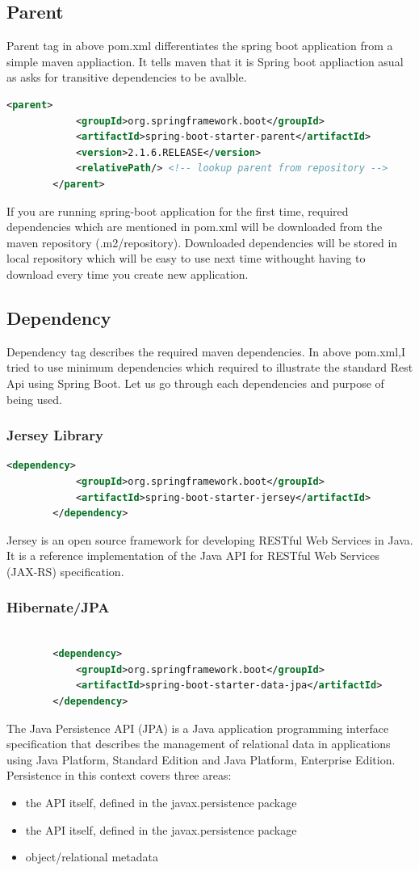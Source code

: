 \documentclass{report}
\begin{document}
	\subsection{Parent}
	Parent tag in above pom.xml differentiates the spring boot application from a simple maven appliaction. It tells maven that it is Spring boot appliaction asual as asks for transitive dependencies to be avalble.
		\begin{lstlisting}[language=xml]
		<parent>
			<groupId>org.springframework.boot</groupId>
			<artifactId>spring-boot-starter-parent</artifactId>
			<version>2.1.6.RELEASE</version>
			<relativePath/> <!-- lookup parent from repository -->
		</parent>
		\end{lstlisting}
	If you are running spring-boot application for the first time, required dependencies which are mentioned in pom.xml will be downloaded from the maven repository (.m2/repository). Downloaded dependencies will be stored in local repository which will be easy to use  next time withought having to download every time you create new application.
	\subsection{Dependency}
	Dependency tag describes the required maven dependencies. In above pom.xml,I tried to use minimum dependencies which required to illustrate the standard Rest Api using Spring Boot. Let us go through each dependencies and purpose of being used. 
	\subsubsection{Jersey Library}
		\begin{lstlisting}[language=xml]
		<dependency>
			<groupId>org.springframework.boot</groupId>
			<artifactId>spring-boot-starter-jersey</artifactId>
		</dependency>
		\end{lstlisting}
		Jersey is an open source framework for developing RESTful Web Services in Java. It is 		a reference implementation of the Java API for RESTful Web Services (JAX-RS) specification. 
	\subsubsection{Hibernate/JPA }
		\begin{lstlisting}[language=xml]
		
		<dependency>
			<groupId>org.springframework.boot</groupId>
			<artifactId>spring-boot-starter-data-jpa</artifactId>
		</dependency>
		\end{lstlisting}
		The Java Persistence API (JPA) is a Java application programming interface 	specification that describes the management of relational data in applications using Java 	Platform, Standard Edition and Java Platform, Enterprise Edition. 	Persistence in this context 	covers three areas: 
		\begin{itemize}
			\item the API itself, defined in the javax.persistence package
			\item the API itself, defined in the javax.persistence package
			\item object/relational metadata
		\end{itemize}		
\end{document}
